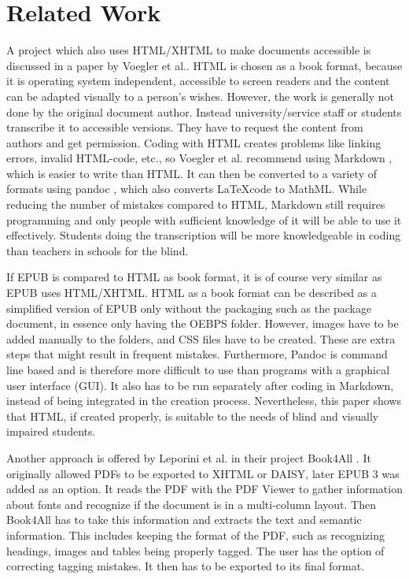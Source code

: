 
\chapter{Related Work}
\label{ch:RelatedWork}

A project which also uses HTML/XHTML to make documents accessible is discussed in a paper \cite{markdownSyntax} by Voegler et al.. HTML is chosen as a book format, because it is operating system independent, accessible to screen readers and the content can be adapted visually to a person's wishes.  However, the work is generally not done by the original document author. Instead university/service staff or students transcribe it to accessible versions. They have to request the content from authors and get permission. 
Coding with HTML creates problems like linking errors, invalid HTML-code, etc., so Voegler et al. recommend using Markdown \cite{Markdown}, which is easier to write than HTML. It can then be converted to a variety of formats using pandoc \cite{Pandoc}, which also converts \LaTeX code to MathML.
While reducing the number of mistakes compared to HTML, Markdown still requires programming and only people with sufficient knowledge of it will be able to use it effectively. Students doing the transcription will be more knowledgeable in coding than teachers in schools for the blind. 

If EPUB is compared to HTML as book format, it is of course very similar as EPUB uses HTML/XHTML. HTML as a book format can be described as a simplified version of EPUB only without the packaging such as the package document, in essence only having the OEBPS folder. However, images have to be added manually to the folders, and CSS files have to be created. These are extra steps that might result in frequent mistakes. Furthermore, Pandoc is command line based and is therefore more difficult to use than programs with a graphical user interface (GUI). It also has to be run separately after coding in Markdown, instead of being integrated in the creation process. Nevertheless, this paper shows that HTML, if created properly, is suitable to the needs of blind and visually impaired students.

Another approach is offered by Leporini et al. in their project Book4All \cite{book4all}. It originally allowed PDFs to be exported to XHTML or DAISY, later EPUB 3 was added as an option. It reads the PDF with the PDF Viewer to gather information about fonts and recognize if the document is in a multi-column layout. Then Book4All has to take this information and extracts the text and semantic information. This includes keeping the format of the PDF, such as recognizing headings, images and tables being properly tagged. The user has the option of correcting tagging mistakes. It then has to be exported to its final format. 

